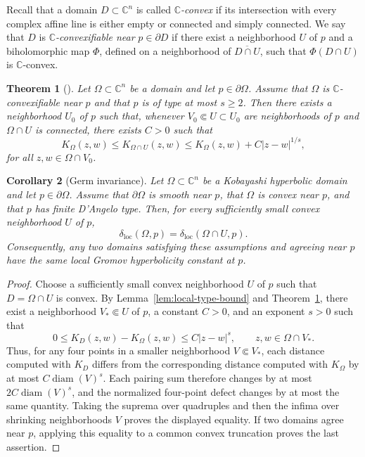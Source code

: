 \documentclass[11pt]{article}
\newtheorem{theorem}{Theorem}[section]
\newtheorem{corollary}[theorem]{Corollary}
\theoremstyle{definition}
\newcommand{\C}{\mathbb{C}}
\begin{document}
Recall that a domain \(D\subset\C^n\) is called \emph{\(\C\)-convex} if
its intersection with every complex affine line is either empty or
connected and simply connected.  We say that \(D\) is
\emph{\(\C\)-convexifiable near} \(p\in\partial D\) if there exist a
neighborhood \(U\) of \(p\) and a biholomorphic map \(\Phi\), defined
on a neighborhood of \(\overline{D\cap U}\), such that
\(\Phi(D\cap U)\) is \(\C\)-convex.
\begin{theorem}[{\cite[Theorem~1.1]{NikolovThomas}}]
	\label{thm:nikolov-thomas-localization}
	Let \(\Omega\subset\C^n\) be a domain and let \(p\in\partial \Omega\).
	Assume that \(\Omega\) is \(\C\)-convexifiable near \(p\) and that \(p\) is of
	type at most \(s\ge2\).  Then there exists a neighborhood \(U_0\) of \(p\)
	such that, whenever
	\(
	V_0\Subset U\subset U_0
\)
	are neighborhoods of \(p\) and \(\Omega\cap U\) is connected, there exists
	\(C>0\) such that
	\begin{equation*}
		K_\Omega(z,w)
		\le
		K_{\Omega\cap U}(z,w)
		\le
		K_\Omega(z,w)+C|z-w|^{1/s},
	\end{equation*}
	for all \(z,w\in \Omega\cap V_0\).
\end{theorem}

\begin{corollary}[Germ invariance]\label{cor:local-germ-invariance}
Let \(\Omega\subset\C^n\) be a Kobayashi hyperbolic domain and let
\(p\in\partial\Omega\). Assume that \(\partial\Omega\) is smooth near
\(p\), that \(\Omega\) is convex near \(p\), and that \(p\) has finite
D'Angelo type.
Then, for every sufficiently small convex neighborhood \(U\) of \(p\),
\[
 \delta_{\mathrm{loc}}(\Omega,p)
 =\delta_{\mathrm{loc}}(\Omega\cap U,p).
\]
Consequently, any two domains satisfying these assumptions and agreeing
near \(p\) have the same local Gromov hyperbolicity constant at \(p\).
\end{corollary}

\begin{proof}
Choose a sufficiently small convex neighborhood \(U\) of \(p\) such that
\(D=\Omega\cap U\) is convex. By Lemma~\ref{lem:local-type-bound} and
Theorem~\ref{thm:nikolov-thomas-localization}, there exist a neighborhood
\(V_*\Subset U\) of \(p\), a constant \(C>0\), and an exponent \(s>0\)
such that
\[
 0\leq K_D(z,w)-K_\Omega(z,w)
 \leq C|z-w|^s,
 \qquad z,w\in\Omega\cap V_*.
\]
Thus, for any four points in a smaller neighborhood \(V\Subset V_*\), each
distance computed with \(K_D\) differs from the corresponding distance
computed with \(K_\Omega\) by at most
\(C\operatorname{diam}(V)^s\). Each pairing sum therefore changes by at
most \(2C\operatorname{diam}(V)^s\), and the normalized four-point
defect changes by at most the same quantity. Taking the suprema over
quadruples and then the infima over shrinking neighborhoods \(V\) proves
the displayed equality. If two domains agree near \(p\), applying this
equality to a common convex truncation proves the last assertion.
\end{proof}
\end{document}
